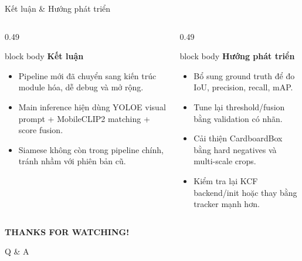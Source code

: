 \documentclass[aspectratio=169]{beamer}
\newcommand{\tightitem}{\setlength\itemsep{0.42em}}
\newenvironment{bluebox}[1]{
  \begin{beamercolorbox}[rounded=true,shadow=false,wd=\linewidth,sep=0.28cm]{block body}
  {\bfseries\color{DeepBlue}#1}\par\vspace{0.12cm}
}{
  \end{beamercolorbox}
}
\begin{document}
\begin{frame}{Kết luận \& Hướng phát triển}
  \begin{columns}[T,onlytextwidth]
    \begin{column}{0.49\textwidth}
      \begin{bluebox}{Kết luận}
        \footnotesize
        \begin{itemize}
          \tightitem
          \item Pipeline mới đã chuyển sang kiến trúc module hóa, dễ debug và mở rộng.
          \item Main inference hiện dùng YOLOE visual prompt + MobileCLIP2 matching + score fusion.
          \item Siamese không còn trong pipeline chính, tránh nhầm với phiên bản cũ.
        \end{itemize}
      \end{bluebox}
    \end{column}
    \begin{column}{0.49\textwidth}
      \begin{bluebox}{Hướng phát triển}
        \footnotesize
        \begin{itemize}
          \tightitem
          \item Bổ sung ground truth để đo IoU, precision, recall, mAP.
          \item Tune lại threshold/fusion bằng validation có nhãn.
          \item Cải thiện CardboardBox bằng hard negatives và multi-scale crops.
          \item Kiểm tra lại KCF backend/init hoặc thay bằng tracker mạnh hơn.
        \end{itemize}
      \end{bluebox}
    \end{column}
  \end{columns}
\end{frame}

{
\begin{frame}[plain]
  \centering
  \vspace{2.0cm}
  {\color{white}\bfseries\fontsize{42}{48}\selectfont THANKS FOR WATCHING!}\par
  \vspace{0.7cm}
  {\color{LightBlue}\Large Q \& A}
\end{frame}
}
\end{document}
